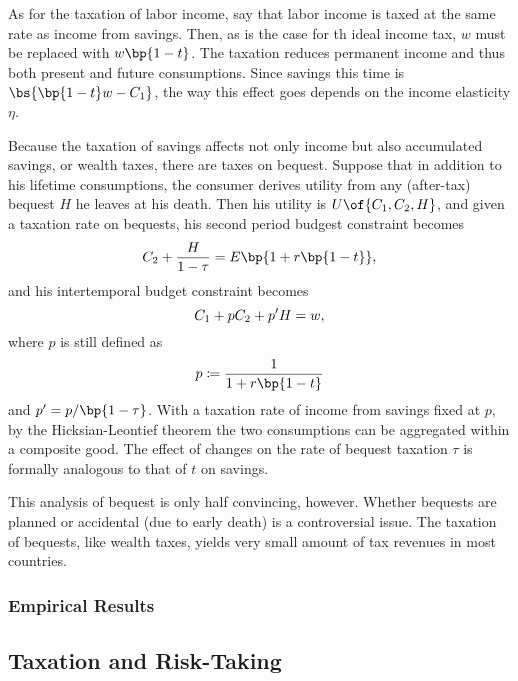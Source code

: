 As for the taxation of labor income, say that labor income is taxed at the same rate as income from savings. Then, as is the case for th ideal income tax, $w$ must be replaced with $w\bp{1-t}$. The taxation reduces permanent income and thus both present and future consumptions. Since savings this time is $\bs{\bp{1-t}w - C_1}$, the way this effect goes depends on the income elasticity $\eta$.

Because the taxation of savings affects not only income but also accumulated savings, or wealth taxes, there are taxes on bequest. Suppose that in addition to his lifetime consumptions, the consumer derives utility from any (after-tax) bequest $H$ he leaves at his death. Then his utility is $U\of{C_1, C_2, H}$, and given a taxation rate on bequests, his second period budgest constraint becomes 
\begin{equation}
    \notag 
    C_2 + \frac{H}{1 - \tau} = E \bp{1 + r\bp{1-t}},
\end{equation}
and his intertemporal budget constraint becomes 
\begin{equation}
    \notag 
    C_1 + p C_2 + p^{\prime} H = w,
\end{equation}
where $p$ is still defined as 
\begin{equation}
    \notag 
    p \coloneqq \frac{1}{1 + r\bp{1-t}}
\end{equation}
and $p^{\prime} = p / \bp{1-\tau}$. With a taxation rate of income from savings fixed at $p$, by the Hicksian-Leontief theorem the two consumptions can be aggregated within a composite good. The effect of changes on the rate of bequest taxation $\tau$ is formally analogous to that of $t$ on savings.

This analysis of bequest is only half convincing, however. Whether bequests are planned or accidental (due to early death) is a controversial issue. The taxation of bequests, like wealth taxes, yields very small amount of tax revenues in most countries. 

\subsubsection{Empirical Results}

\subsection{Taxation and Risk-Taking}


